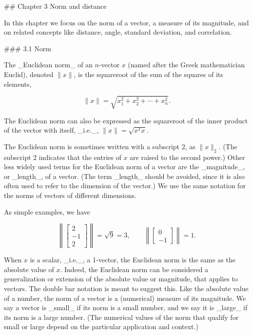 

## Chapter 3 Norm and distance

In this chapter we focus on the norm of a vector, a measure of its magnitude, and on related concepts like distance, angle, standard deviation, and correlation.

### 3.1 Norm

The _Euclidean norm_ of an \(n\)-vector \(x\) (named after the Greek mathematician Euclid), denoted \(\|x\|\), is the squareroot of the sum of the squares of its elements,

\[\|x\|=\sqrt{x_{1}^{2}+x_{2}^{2}+\cdots+x_{n}^{2}}.\]

The Euclidean norm can also be expressed as the squareroot of the inner product of the vector with itself, _i.e._, \(\|x\|=\sqrt{x^{T}x}\).

The Euclidean norm is sometimes written with a subscript 2, as \(\|x\|_{2}\). (The subscript 2 indicates that the entries of \(x\) are raised to the second power.) Other less widely used terms for the Euclidean norm of a vector are the _magnitude_, or _length_, of a vector. (The term _length_ should be avoided, since it is also often used to refer to the dimension of the vector.) We use the same notation for the norms of vectors of different dimensions.

As simple examples, we have

\[\left\|\left[\begin{array}{c}2\\ -1\\ 2\end{array}\right]\right\|=\sqrt{9}=3,\qquad\left\|\left[\begin{array}{c}0 \\ -1\end{array}\right]\right\|=1.\]

When \(x\) is a scalar, _i.e._, a 1-vector, the Euclidean norm is the same as the absolute value of \(x\). Indeed, the Euclidean norm can be considered a generalization or extension of the absolute value or magnitude, that applies to vectors. The double bar notation is meant to suggest this. Like the absolute value of a number, the norm of a vector is a (numerical) measure of its magnitude. We say a vector is _small_ if its norm is a small number, and we say it is _large_ if its norm is a large number. (The numerical values of the norm that qualify for small or large depend on the particular application and context.)